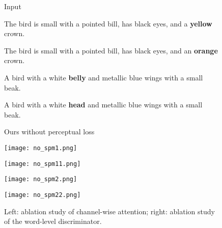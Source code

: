 \documentclass{article}
\begin{document}
\begin{figure}[t]
\begin{minipage}{0.48\textwidth}
\end{minipage}
\centering
\caption{Left: ablation study of channel-wise attention; right: ablation study of the word-level discriminator.}
\label{fig:abla_channel_word}
\bigskip
\begin{minipage}{0.48\textwidth}
\begin{minipage}{0.184\textwidth}
\centering
\tiny{Input}
\end{minipage}
\begin{minipage}{0.184\textwidth}
\centering
\tiny{The bird is small with a pointed bill, has black eyes, and a \textbf{yellow} crown.}
\end{minipage}
\noindent\begin{minipage}{0.184\textwidth}
\centering
\tiny{The bird is small with a pointed bill, has black eyes, and an \textbf{orange} crown.}
\end{minipage}
\noindent\begin{minipage}{0.184\textwidth}
\centering
\tiny{A bird with a white \textbf{belly} and metallic blue wings with a small beak.}
\end{minipage}
\noindent\begin{minipage}{0.184\textwidth}
\centering
\tiny{A bird with a white \textbf{head} and metallic blue wings with a small beak.}
\end{minipage}
\smallskip

\begin{minipage}{0.184\textwidth}
\centering
\tiny{Ours without perceptual loss}
\end{minipage}
\begin{minipage}{0.184\textwidth}
\texttt{[image: no\_spm1.png]}
\end{minipage}
\noindent\begin{minipage}{0.184\textwidth}
\texttt{[image: no\_spm11.png]}
\end{minipage}
\noindent\begin{minipage}{0.184\textwidth}
\texttt{[image: no\_spm2.png]}
\end{minipage}
\noindent\begin{minipage}{0.184\textwidth}
\texttt{[image: no\_spm22.png]}
\end{minipage}


\end{minipage}
\end{figure}
\end{document}
